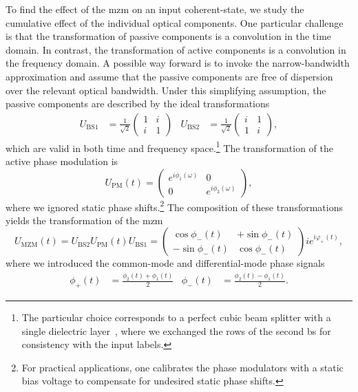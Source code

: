 To find the effect of the \gls{mzm} on an input coherent-state, we study the cumulative effect of the individual optical components.
One particular challenge is that the transformation of passive components is a convolution in the time domain.
In contrast, the transformation of active components is a convolution in the frequency domain.
A possible way forward is to invoke the narrow-bandwidth approximation and assume that the passive components are free of dispersion over the relevant optical bandwidth.
Under this simplifying assumption, the passive components are described by the ideal transformations
\begin{align}
	U_\text{BS1}
	&=
	\frac{1}{\sqrt{2}}
	\begin{pmatrix}
		1 & i \\
		i & 1
	\end{pmatrix}
	&
	U_\text{BS2}
	&=
	\frac{1}{\sqrt{2}}
	\begin{pmatrix}
		i & 1 \\
		1 & i
	\end{pmatrix}
	,
\end{align}
which are valid in both time and frequency space.\footnote{The particular choice corresponds to a perfect cubic beam splitter with a single dielectric layer~\cite[p.~139]{Gerry2005}, where we exchanged the rows of the second \gls{bs} for consistency with the input labels.}
The transformation of the active phase modulation is
\begin{equation}
	U_\text{PM}(t)
	=
	\begin{pmatrix}
		e^{i\phi_1(\omega)} & 0 \\
		0 & e^{i\phi_2(\omega)}
	\end{pmatrix}
	,
\end{equation}
where we ignored static phase shifts.\footnote{For practical applications, one calibrates the phase modulators with a static bias voltage to compensate for undesired static phase shifts.}
The composition of these transformations yields the transformation of the \gls{mzm}
\begin{equation}
	U_\text{MZM}(t)
	=
	U_\text{BS2}
	U_\text{PM}(t)
	U_\text{BS1}
	=
	\begin{pmatrix}
		\cos\phi_-(t) & +\sin\phi_-(t) \\
		-\sin\phi_-(t) & \cos\phi_-(t)
	\end{pmatrix}
	ie^{i\varphi_+(t)}
	\label{eq:mzm_matrix}
	,
\end{equation}
where we introduced the common-mode and differential-mode phase signals
\begin{align}
	\phi_+(t)
	&=
	\frac{\phi_2(t)+\phi_1(t)}{2}
	&
	\phi_-(t)
	&=
	\frac{\phi_2(t)-\phi_1(t)}{2}
	.
\end{align}
